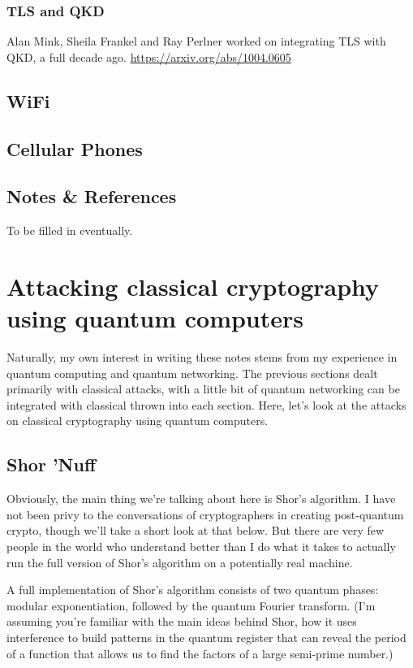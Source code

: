 \documentclass[%
 aip,
 jmp,%
 amsmath,amssymb,
 reprint,%
]{revtex4-1}
\begin{document}
\subsubsection{TLS and QKD}

Alan Mink, Sheila Frankel and Ray Perlner worked on integrating TLS
with QKD, a full decade ago.
\url{https://arxiv.org/abs/1004.0605}

\subsection{WiFi}

\subsection{Cellular Phones}

\subsection{Notes \& References}

To be filled in eventually.

\section{Attacking classical cryptography using quantum computers}

Naturally, my own interest in writing these notes stems from my
experience in quantum computing and quantum networking.  The previous
sections dealt primarily with classical attacks, with a little bit of
quantum networking can be integrated with classical thrown into each
section.  Here, let's look at the attacks on classical cryptography
using quantum computers.

\subsection{Shor 'Nuff}

Obviously, the main thing we're talking about here is Shor's
algorithm.  I have not been privy to the conversations of
cryptographers in creating post-quantum crypto, though we'll take a
short look at that below.  But there are very few people in the world
who understand better than I do what it takes to actually run the full
version of Shor's algorithm on a potentially real machine.

A full implementation of Shor's algorithm consists of two quantum
phases: modular exponentiation, followed by the quantum Fourier
transform.  (I'm assuming you're familiar with the main ideas behind
Shor, how it uses interference to build patterns in the quantum
register that can reveal the period of a function that allows us to
find the factors of a large semi-prime number.)
\end{document}
